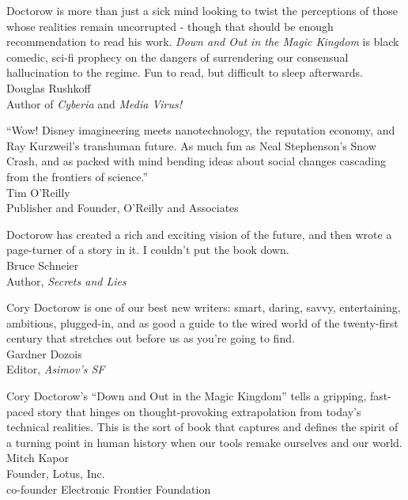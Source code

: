{\bigskip

Doctorow is more than just a sick mind looking to twist the
perceptions of those whose realities remain uncorrupted - though
that should be enough recommendation to read his work.
\emph{Down and Out in the Magic Kingdom} is black comedic, sci-fi
prophecy on the dangers of surrendering our consensual
hallucination to the regime. Fun to read, but difficult to sleep
afterwards.
\\
\hspace*{\fill}Douglas Rushkoff
\\
\hspace*{\fill}Author of \emph{Cyberia} and \emph{Media Virus!}

\bigskip

“Wow! Disney imagineering meets nanotechnology, the reputation
economy, and Ray Kurzweil's transhuman future. As much fun as Neal
Stephenson's Snow Crash, and as packed with mind bending ideas
about social changes cascading from the frontiers of science.”
\\
\hspace*{\fill}Tim O'Reilly
\\
\hspace*{\fill}Publisher and Founder, O'Reilly and Associates

\bigskip

Doctorow has created a rich and exciting vision of the future, and
then wrote a page-turner of a story in it. I couldn't put the book
down.
\\
\hspace*{\fill}Bruce Schneier
\\
\hspace*{\fill}Author, \emph{Secrets and Lies}

\bigskip

Cory Doctorow is one of our best new writers: smart, daring, savvy,
entertaining, ambitious, plugged-in, and as good a guide to the
wired world of the twenty-first century that stretches out before
us as you're going to find.
\\
\hspace*{\fill}Gardner Dozois
\\
\hspace*{\fill}Editor, \emph{Asimov's SF}

\bigskip

Cory Doctorow's “Down and Out in the Magic Kingdom” tells a
gripping, fast-paced story that hinges on thought-pro\-vok\-ing
extrapolation from today's technical realities. This is the sort of
book that captures and defines the spirit of a turning point in
human history when our tools remake ourselves and our world.
\\
\hspace*{\fill}Mitch Kapor
\\
\hspace*{\fill}Founder, Lotus, Inc.\\
\hspace*{\fill}co-founder Electronic Frontier Foundation

}

